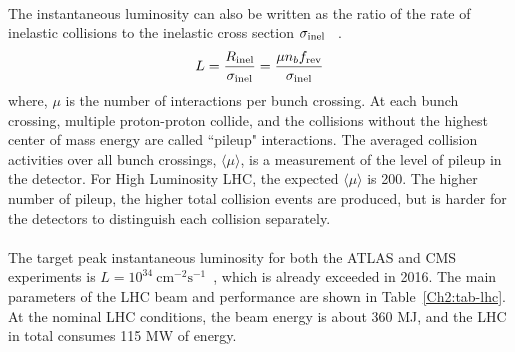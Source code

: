 \paragraph{}
The instantaneous luminosity can also be written as the ratio of the rate of inelastic collisions to the inelastic cross section $\sigma_{\rm inel}$ ~\cite{lumi-paper}. 
\begin{equation}
\label{Ch2:eq-lumi2}
L = \frac{R_{\rm inel}}{\sigma_{\rm inel}} = \frac{\mu n_b f_{\rm rev}}{\sigma_{\rm inel}}
\end{equation}
where, $\mu$ is the number of interactions per bunch crossing. At each bunch crossing, multiple proton-proton collide, and the collisions without the highest center of mass energy are called ``pileup" interactions. The averaged collision activities over all bunch crossings, $\langle \mu \rangle$, is a measurement of the level of pileup in the detector. For High Luminosity LHC, the expected $\langle \mu \rangle$ is 200. The higher number of pileup, the higher total collision events are produced, but is harder for the detectors to distinguish each collision separately.


\paragraph{}
The target peak instantaneous luminosity for both the ATLAS and CMS experiments is $L=10^{34}~\text{cm}^{-2}\text{s}^{-1}$~\cite{LHCPaper}, which is already exceeded in 2016. The main parameters of the LHC beam and performance are shown in Table~\ref{Ch2:tab-lhc}. At the nominal LHC conditions, the beam energy is about 360 MJ, and the LHC in total consumes 115 MW of energy. 

